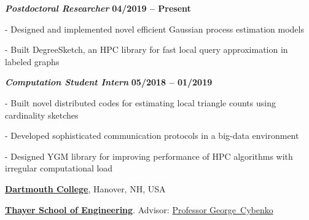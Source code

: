 \documentclass[10pt]{article}
\newcommand{\halfblankline}{\quad\vspace{-0.5\baselineskip}\pagebreak[3]}
\begin{document}
\vspace{-0.5em}
\begin{outerlist}

\item[] \textbf{\textit{Postdoctoral Researcher}}%
\hfill \textbf{04/2019 -- Present}

\begin{innerlist}

\item[-] Designed and implemented novel efficient Gaussian process estimation models

\item[-] Built DegreeSketch, an HPC library for fast local query approximation in labeled graphs

\end{innerlist}

\item[] \textbf{\textit{Computation Student Intern}}%
\hfill \textbf{05/2018 -- 01/2019}

\begin{innerlist}

\item[-] Built novel distributed codes for estimating local triangle counts using cardinality sketches

\item[-] Developed sophisticated communication protocols in a big-data environment

\item[-] Designed YGM library for improving performance of HPC algorithms with irregular computational load

\end{innerlist}
\end{outerlist}





\halfblankline








\href{https://dartmouth.edu}{\textbf{Dartmouth College}},
Hanover, NH, USA

\href{https://engineering.dartmouth.edu/}{\textbf{Thayer School of Engineering}}.
Advisor:               
\href{http://www.dartmouth.edu/~gvc/}
{Professor George~Cybenko}

\vspace{-0.5em}
\end{document}
